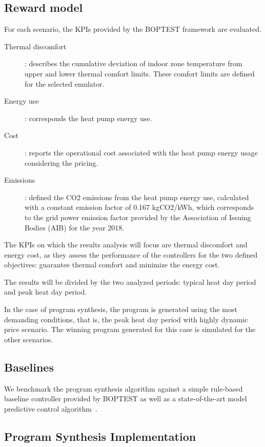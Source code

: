\subsection{Reward model}

For each scenario, the KPIs provided by the BOPTEST framework are evaluated.
 \begin{description}
     \item[Thermal discomfort]: describes the cumulative deviation of indoor zone temperature from upper and lower thermal comfort limits. These comfort limits are defined for the selected emulator.
     \item[Energy use]: corresponds the heat pump energy use.
     \item[Cost]: reports the operational cost associated with the heat pump energy usage considering the pricing.
     \item[Emissions]: defined the CO2 emissions from the heat pump energy use, calculated with a constant emission factor of 0.167 kgCO2/kWh, which corresponds to the grid power emission factor provided by the Association of Issuing Bodies (AIB) for the year 2018. 
 \end{description}
The KPIs on which the results analysis will focus are thermal discomfort and energy cost, as they assess the performance of the controllers for the two defined objectives: guarantee thermal comfort and minimize the energy cost.

The results will be divided by the two analyzed periods: typical heat day period and peak heat day period.

In the case of program synthesis, the program is generated using the most demanding conditions, that is, the peak heat day period with highly dynamic price scenario. The winning program generated for this case is simulated for the other scenarios.

\subsection{Baselines}

We benchmark the program synthesis algorithm against a simple rule-based baseline controller provided by BOPTEST as well as a state-of-the-art model predictive control algorithm~\cite{zabalaComparisonProgramSynthesis2023}.

\newpage
\subsection{Program Synthesis Implementation}
\label{sec:boptest-impl}

